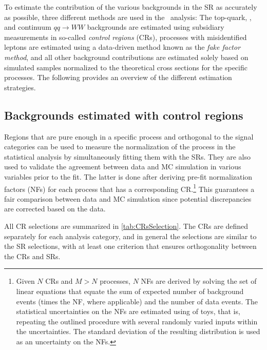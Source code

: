 To estimate the contribution of the various backgrounds in the SR as accurately as possible, three different methods are used in the \HWW\ analysis:
The top-quark, \Zjets, and continuum $qq \to WW$ backgrounds are estimated using subsidiary measurements in so-called \emph{control regions} (CRs), processes with misidentified leptons are estimated using a data-driven method known as the \emph{fake factor method}, and all other background contributions are estimated solely based on simulated samples normalized to the theoretical cross sections for the specific processes.
The following provides an overview of the different estimation strategies. 

\subsection{Backgrounds estimated with control regions}
Regions that are pure enough in a specific process and orthogonal to the signal categories can be used to measure the normalization of the process in the statistical analysis by simultaneously fitting them with the SRs. 
They are also used to validate the agreement between data and MC simulation in various variables prior to the fit.
The latter is done after deriving pre-fit normalization factors (NFs) for each process that has a corresponding CR.\footnote{Given $N$ CRs and $M > N$ processes, $N$ NFs are derived by solving the set of linear equations that equate the sum of expected number of background events (times the NF, where applicable) and the number of data events. The statistical uncertainties on the NFs are estimated using of toys, that is, repeating the outlined procedure with several randomly varied inputs within the uncertainties. The standard deviation of the resulting distribution is used as an uncertainty on the NFs.}
This guarantees a fair comparison between data and MC simulation since potential discrepancies are corrected based on the data. 

All CR selections are summarized in \cref{tab:CRsSelection}. 
The CRs are defined separately for each analysis category, and in general the selections are similar to the SR selections, with at least one criterion that ensures orthogonality between the CRs and SRs.

